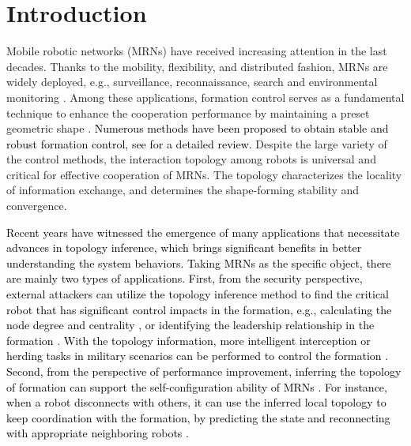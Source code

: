 \documentclass[12pt,journal,draftclsnofoot,onecolumn]{IEEEtran}
\begin{document}
\section{Introduction}
Mobile robotic networks (MRNs) have received increasing attention in the last decades. 
Thanks to the mobility, flexibility, and distributed fashion, MRNs are widely deployed, e.g., surveillance, reconnaissance, search and environmental monitoring \cite{bullo2009distributed}. 
Among these applications, formation control serves as a fundamental technique to enhance the cooperation performance by maintaining a preset geometric shape \cite{olfati2004consensus}. 
\textcolor{black}{
Numerous methods have been proposed to obtain stable and robust formation control, see \cite{oh2015survey,kamel2020formation} for a detailed review.} 
Despite the large variety of the control methods, the interaction topology among robots is universal and critical for effective cooperation of MRNs. 
The topology characterizes the locality of information exchange, and determines the shape-forming stability and convergence. 

\textcolor{black}{
Recent years have witnessed the emergence of many applications that necessitate advances in topology inference, which brings significant benefits in better understanding the system behaviors. 
Taking MRNs as the specific object, there are mainly two types of applications. 
First, from the security perspective, external attackers can utilize the topology inference method to find the critical robot that has significant control impacts in the formation, e.g., calculating the node degree and centrality \cite{zhang2014analysis}, or identifying the leadership relationship in the formation \cite{vasquez2018network}. 
With the topology information, more intelligent interception or herding tasks in military scenarios can be performed to control the formation \cite{choi2018detecting,li2019learning,licitra2019single,li2020unpredictable}. 
Second, from the perspective of performance improvement, inferring the topology of formation can support the self-configuration ability of MRNs \cite{venkitaraman2020recursive}. 
For instance, when a robot disconnects with others, it can use the inferred local topology to keep coordination with the formation, by predicting the state and reconnecting with appropriate neighboring robots \cite{li2019optimal}. }
\end{document}
